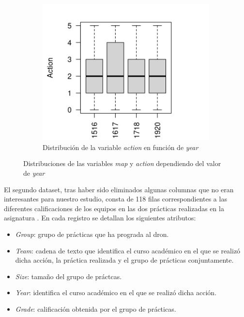 \begin{figure}[!tbp]
\begin{subfigure}[b]{0.49\textwidth}
    \includegraphics[width=\textwidth, height=\textwidth]{imagenes/Rplot05.png}
    \caption{Distribución de la variable \emph{action} en función de \emph{year}}
    \label{fig:actionyear}
  \end{subfigure}
  \caption{Distribuciones de las variables \emph{map} y \emph{action} dependiendo del valor de \emph{year}}
\end{figure}

El segundo dataset, tras haber sido eliminados algunas columnas que no eran interesantes para nuestro estudio, consta de 118 filas correspondientes a las diferentes calificaciones de los equipos en las dos prácticas realizadas en la asignatura \href{https://www.ugr.es/estudiantes/grados/grado-ingenieria-informatica/desarrollo-basado-agentes-ing-software}{\color{blue}{Desarrollo Basado en Agentes}}. En cada registro se detallan los siguientes atributos:
\begin{itemize}
\item \emph{Group}: grupo de prácticas que ha prograda al dron.
\item \emph{Team}: cadena de texto que identifica el curso académico en el que se realizó dicha acción, la práctica realizada y el grupo de prácticas conjuntamente.
\item \emph{Size}: tamaño del grupo de práctcas.
\item \emph{Year}: identifica el curso académico en el que se realizó dicha acción.
\item \emph{Grade}: calificación obtenida por el grupo de prácticas.
\end{itemize}

